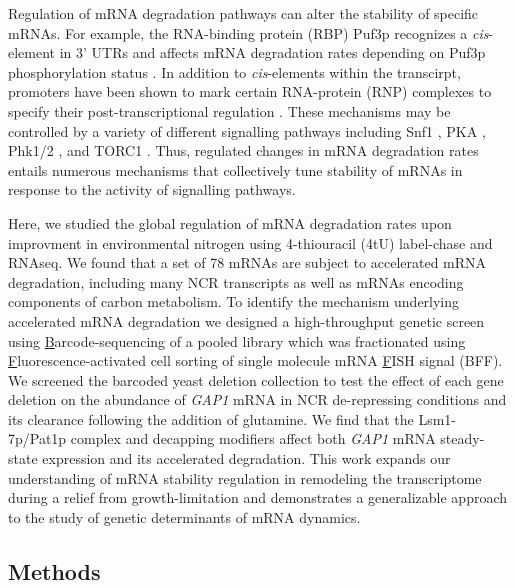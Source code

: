 Regulation of mRNA degradation pathways can alter the stability of
specific mRNAs. For example, the RNA-binding protein (RBP) Puf3p
recognizes a \textit{cis}-element in 3' UTRs \parencite{olivas2000puf3}
and affects mRNA degradation rates depending on
Puf3p phosphorylation status \parencite{lee2015glucose}. 
In addition to \textit{cis}-elements within the transcirpt, 
promoters have
been shown to mark certain RNA-protein (RNP) complexes to specify
their post-transcriptional regulation
\parencite{mercado1994levels,haimovich2013gene,trcek2011single,braun2016snf1}. These
mechanisms may be controlled by a variety of different signalling
pathways including Snf1
\parencite{young2012amp,braun2014phosphoproteomic}, PKA
\parencite{ramachandran2011camp}, Phk1/2 \parencite{luo2011nutrients}, and TORC1
\parencite{talarek2010initiation}. Thus, regulated changes in  mRNA degradation
rates entails numerous mechanisms that collectively tune stability of
mRNAs in response to the activity of signalling pathways. 

Here, we studied the global regulation of mRNA degradation rates upon
improvment in environmental nitrogen using 4-thiouracil (4tU) 
label-chase and RNAseq.
We found that a set of 78 mRNAs are subject to accelerated mRNA
degradation, including many NCR transcripts as well as mRNAs
encoding components of
carbon metabolism. To identify the mechanism underlying accelerated
mRNA degradation we designed a high-throughput genetic screen using 
\underline{B}arcode-sequencing of a pooled library which was
fractionated using \underline{F}luorescence-activated cell 
sorting of single molecule mRNA \underline{F}ISH signal (BFF). 
We screened the barcoded
yeast deletion collection to test the effect of each gene deletion
on the abundance of \textit{GAP1} mRNA in NCR de-repressing 
conditions and its clearance following the 
addition of glutamine. We
find that the Lsm1-7p/Pat1p complex and decapping modifiers affect
both \textit{GAP1} mRNA steady-state expression and its 
accelerated degradation.
This work expands our
understanding of mRNA stability regulation in remodeling the
transcriptome during a relief from growth-limitation and demonstrates
a generalizable approach to the study of genetic determinants of mRNA
dynamics.

\subsection{Methods}

